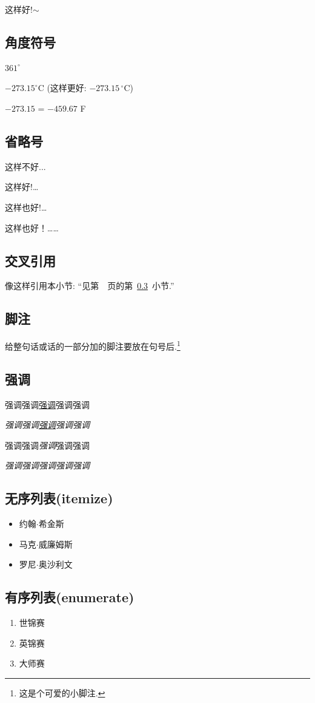 \documentclass{ctexart}
\begin{document}
    这样好!$\sim$
    \subsection{角度符号}
    $361^{\circ}$

    $-273.15^{\circ}\mathrm{C}$ (这样更好: $-273.15\,^{\circ}\mathrm{C}$)

    $-273.15$ \textcelsius{} = $-459.67$ \textdegree{}F
    \subsection{省略号}
    这样不好...

    这样好!\dots{}

    这样也好!\ldots{}

    这样也好！……
    \subsection{交叉引用}\label{ref}
    像这样引用本小节: ``见第~\pageref{ref}~页的第~\ref{ref}~小节.''
    \subsection{脚注}
    给整句话或话的一部分加的脚注要放在句号后.\footnote{这是个可爱的小脚注.}
    \subsection{强调}
    强调强调\uline{强调}强调强调

    \textit{强调强调\uline{强调}强调强调}

    强调强调\emph{强调}强调强调

    \textit{强调强调\emph{强调}强调强调}
    \subsection{无序列表(itemize)}
    \begin{itemize}
        \item 约翰$\cdot$希金斯
        \item 马克$\cdot$威廉姆斯
        \item 罗尼$\cdot$奥沙利文
    \end{itemize}
    \subsection{有序列表(enumerate)}
    \begin{enumerate}
        \item 世锦赛
        \item 英锦赛
        \item 大师赛
    \end{enumerate}
\end{document}
